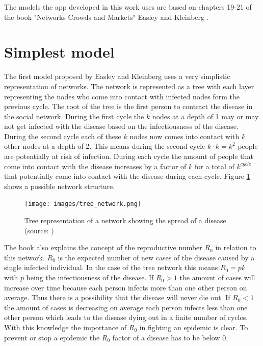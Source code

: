 The models the app developed in this work uses are based on chapters 19-21 of the book
"Networks Crowds and Markets" Easley and Kleinberg \cite{networks}.

\section{Simplest model}
The first model proposed by Easley and Kleinberg \cite{networks} uses a very simplistic
representation of networks. The network is represented as a tree with each layer representing
the nodes who come into contact with infected nodes form the previous cycle. The root
of the tree is the first person to contract the disease in the social network. During the
first cycle the $k$ nodes at a depth of 1 may or may not get infected with the disease based
on the infectiousness of the disease. During the second cycle each of these $k$ nodes
now comes into contact with $k$ other nodes at a depth of 2. This means during the second
cycle $k \cdot k = k^2$ people are potentially at risk of infection. During each cycle the
amount of people that come into contact with the disease increases by a factor of $k$ for
a total of $k^{cycle}$ that potentially come into contact with the disease during each cycle.
Figure \ref{fig:tree_network} shows a possible network structure.

\begin{figure}
    \centering
    \texttt{[image: images/tree\_network.png]}
    \caption{Tree representation of a network showing the spread of a disease (source: \cite{networks})}
    \label{fig:tree_network}
\end{figure}

The book \cite{networks} also explains the concept of the reproductive number $R_0$ in
relation to this network. $R_0$ is the expected number of new cases of the disease
caused by a single infected individual. In the case of the tree network this means 
$R_0 = pk$ with $p$ being the infectiousness of the disease. If $R_0 > 1$ the amount
of cases will increase over time because each person infects more than one other person
on average. Thus there is a possibility that the disease will never
die out. If $R_0 < 1$ the amount of cases is decreasing on average each person infects less
than one other person which leads to the disease dying out in a finite number of cycles.
With this knowledge the importance of $R_0$ in fighting an epidemic is clear. To prevent
or stop a epidemic the $R_0$ factor of a disease has to be below 0.

